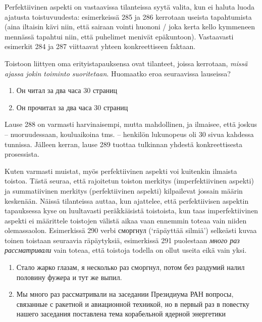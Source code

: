 \documentclass[]{scrreprt}
\providecommand{\tightlist}{%
  \setlength{\itemsep}{0pt}\setlength{\parskip}{0pt}}
\begin{document}
Perfektiivinen aspekti on vastaavissa tilanteissa syytä valita, kun ei
haluta luoda ajatusta toistuvuudesta: esimerkeissä 285 ja 286 kerrotaan
useista tapahtumista (aina iltaisin kävi niin, että sairaan vointi
huononi / joka kerta kello kymmeneen mennässä tapahtui niin, että
puhelimet menivät epäkuntoon). Vastaavasti esimerkit 284 ja 287
viittaavat yhteen konkreettiseen faktaan.

Toistoon liittyen oma erityistapauksensa ovat tilanteet, joissa
kerrotaan, \emph{missä ajassa jokin toiminto suoritetaan}. Huomaatko
eroa seuraavissa lauseissa?

\begin{enumerate}
\def\labelenumi{(\arabic{enumi})}
\setcounter{enumi}{287}
\tightlist
\item
  Он читал за два часа 30 страниц
\item
  Он прочитал за два часа 30 страниц
\end{enumerate}

Lause 288 on varmasti harvinaisempi, mutta mahdollinen, ja ilmaisee,
että joskus -- nuoruudessaan, kouluaikoina tms. -- henkilön lukunopeus
oli 30 sivua kahdessa tunnissa. Jälleen kerran, lause 289 tuottaa
tulkinnan yhdestä konkreettisesta prosessista.

Kuten varmasti muistat, myös perfektiivinen aspekti voi kuitenkin
ilmaista toistoa. Tästä seuraa, että rajoitetun toiston merkitys
(imperfektiivinen aspekti) ja summatiivinen merkitys (perfektiivinen
aspekti) kilpailevat jossain määrin keskenään. Näissä tilanteissa
auttaa, kun ajattelee, että perfektiivisen aspektin tapauksessa kyse on
luultavasti peräkkäisistä toistoista, kun taas imperfektiivinen aspekti
ei määrittele toistojen välistä aikaa vaan ennemmin toteaa vain niiden
olemassaolon. Esimerkissä 290 verbi сморгнул (`räpäyttää silmiä')
selkeästi kuvaa toinen toistaan seuraavia räpäytyksiä, esimerkissä 291
puolestaan \emph{много раз рассматривали} vain toteaa, että toistoja
todella on ollut useita eikä vain yksi.

\begin{enumerate}
\def\labelenumi{(\arabic{enumi})}
\setcounter{enumi}{289}
\tightlist
\item
  Стало жарко глазам, я несколько раз сморгнул, потом без раздумий налил
  половину фужера и тут же выпил.
\item
  Мы много раз рассматривали на заседании Президиума РАН вопросы,
  связанные с ракетной и авиационной техникой, но в первый раз в
  повестку нашего заседания поставлена тема корабельной ядерной
  энергетики
\end{enumerate}
\end{document}
